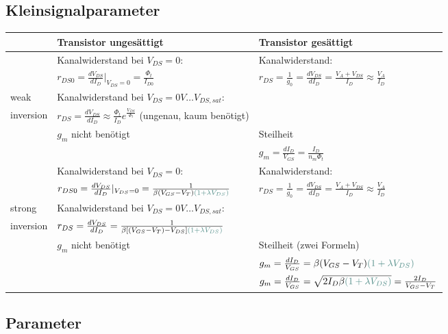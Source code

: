 \subsection{Kleinsignalparameter}
\begin{tabularx}{\linewidth}{|X|l|l|}
	\hline
		& \textbf{Transistor ungesättigt} & \textbf{Transistor gesättigt} 
	\\ \hline
		& Kanalwiderstand bei $V_{DS}=0$:
		& Kanalwiderstand:
	\\
		& $r_{DS0} = \frac{dV_{DS}}{dI_D}|_{V_{DS}=0} = \frac{\Phi_t}{I_{D0}}$
		& $r_{DS} = \frac{1}{g_0} = \frac{dV_{DS}}{dI_D} = \frac{V_A + V_{DS}}{I_D} \approx \frac{V_A}{I_D}$
	\\ weak
		& Kanalwiderstand bei $V_{DS} = 0V \dots V_{DS,sat}$:
		& 
	\\ inversion
		& $r_{DS} = \frac{dV_{DS}}{dI_D} \approx \frac{\Phi_t}{I_D} e^{\frac{V_{DS}}{\Phi_t}}$ (ungenau, kaum benötigt)
		&
	\\ \cline{2-3}
		& $g_m$ nicht benötigt
		& Steilheit
	\\
		& 
		& $g_m =  \frac{dI_D}{V_{GS}} = \frac{I_D}{n_m \Phi_t}$	
	\\ \hline
		& Kanalwiderstand bei $V_{DS}=0$:
		& Kanalwiderstand:
	\\
		& $r_{DS0} = \frac{dV_{DS}}{dI_D}|_{V_{DS}=0} = \frac{1}{\beta (V_{GS} - V_T) \textcolor{HSRLakeGreen}{(1 + \lambda V_{DS})}}$
		& $r_{DS} = \frac{1}{g_0} = \frac{dV_{DS}}{dI_D} = \frac{V_A + V_{DS}}{I_D} \approx \frac{V_A}{I_D}$
	\\ strong
		& Kanalwiderstand bei $V_{DS} = 0V \dots V_{DS,sat}$:
		& 
	\\ inversion
		& $r_{DS} = \frac{dV_{DS}}{dI_D} = \frac{1}{\beta [(V_{GS} - V_T)-V_{DS}] \textcolor{HSRLakeGreen}{(1 + \lambda V_{DS})}}$
		& 
	\\ \cline{2-3} 
		& $g_m$ nicht benötigt
		& Steilheit (zwei Formeln)
	\\
		&
		& $g_m = \frac{dI_D}{V_{GS}} = \beta (V_{GS} - V_T) \textcolor{HSRLakeGreen}{(1 + \lambda V_{DS})}$
	\\
		&
		& $g_m = \frac{dI_D}{V_{GS}} = \sqrt{2 I_D \beta \textcolor{HSRLakeGreen}{(1 + \lambda V_{DS})}} = \frac{2 I_D}{V_{GS} - V_T}$
	\\ \hline
\end{tabularx}

\subsection{Parameter}

